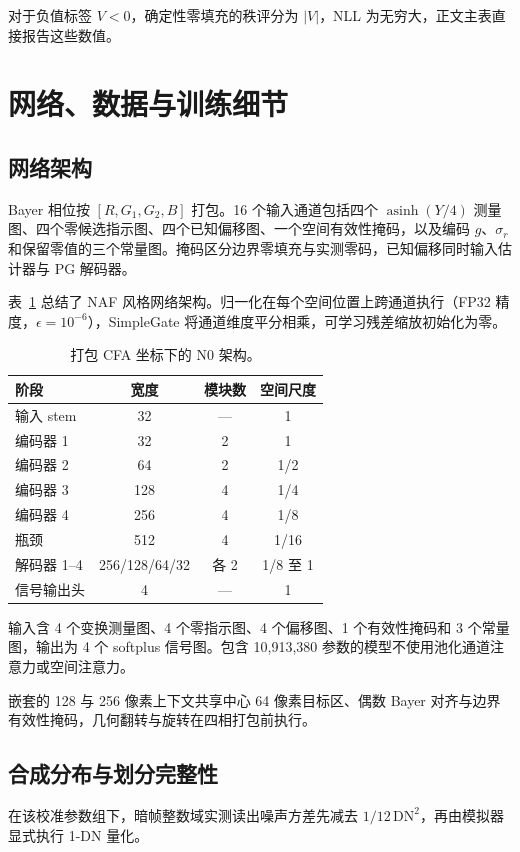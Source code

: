 \documentclass[10pt,twocolumn,journal]{IEEEtran}
\begin{document}
对于负值标签 $V<0$，确定性零填充的秩评分为 $|V|$，NLL 为无穷大，正文主表直接报告这些数值。

\section{网络、数据与训练细节}
\subsection{网络架构}
Bayer 相位按 $[R,G_1,G_2,B]$ 打包。16 个输入通道包括四个 $\operatorname{asinh}(Y/4)$ 测量图、四个零候选指示图、四个已知偏移图、一个空间有效性掩码，以及编码 $g$、$\sigma_r$ 和保留零值的三个常量图。掩码区分边界零填充与实测零码，已知偏移同时输入估计器与 PG 解码器。

表~\ref{tab:architecture} 总结了 NAF 风格网络架构。归一化在每个空间位置上跨通道执行（FP32 精度，$\epsilon=10^{-6}$），SimpleGate 将通道维度平分相乘，可学习残差缩放初始化为零。

\begin{table}[t]
\centering\footnotesize
\caption{打包 CFA 坐标下的 N0 架构。}
\label{tab:architecture}
\setlength{\tabcolsep}{3pt}
\begin{tabular}{@{}lccc@{}}
\toprule
阶段 & 宽度 & 模块数 & 空间尺度\\
\midrule
输入 stem & 32 & --- & 1\\
编码器 1 & 32 & 2 & 1\\
编码器 2 & 64 & 2 & 1/2\\
编码器 3 & 128 & 4 & 1/4\\
编码器 4 & 256 & 4 & 1/8\\
瓶颈 & 512 & 4 & 1/16\\
解码器 1--4 & 256/128/64/32 & 各 2 & 1/8 至 1\\
信号输出头 & 4 & --- & 1\\
\bottomrule
\end{tabular}

\vspace{3pt}
\footnotesize 输入含 4 个变换测量图、4 个零指示图、4 个偏移图、1 个有效性掩码和 3 个常量图，输出为 4 个 softplus 信号图。包含 10,913,380 参数的模型不使用池化通道注意力或空间注意力。
\end{table}

嵌套的 128 与 256 像素上下文共享中心 64 像素目标区、偶数 Bayer 对齐与边界有效性掩码，几何翻转与旋转在四相打包前执行。

\subsection{合成分布与划分完整性}
在该校准参数组下，暗帧整数域实测读出噪声方差先减去 $1/12\,\mathrm{DN}^2$，再由模拟器显式执行 1-DN 量化。
\end{document}
